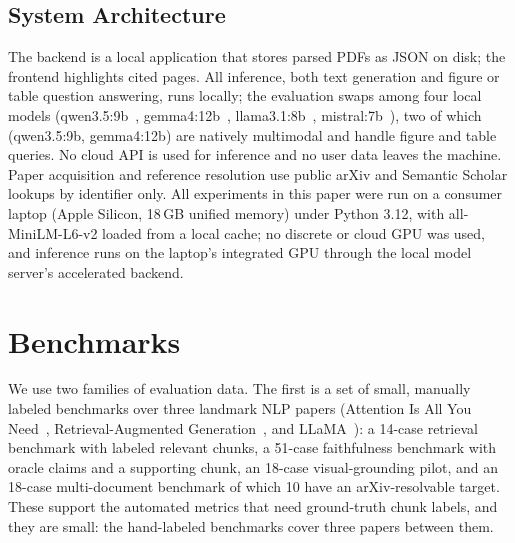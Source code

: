 \documentclass[letterpaper]{article} %
\begin{document}
\subsection{System Architecture}
The backend is a local application that stores parsed PDFs as JSON on disk; the
frontend highlights cited pages. All inference, both text generation and figure or
table question answering, runs locally; the evaluation swaps among four local models
(qwen3.5:9b~\citep{qwenteam2026qwen35}, gemma4:12b~\citep{gemmateam2024gemma},
llama3.1:8b~\citep{llamateam2024llama3}, mistral:7b~\citep{jiang2023mistral}),
two of which (qwen3.5:9b, gemma4:12b) are natively multimodal and handle figure and
table queries. No cloud API is used for inference and no user data leaves the machine. Paper
acquisition and reference resolution use public arXiv and Semantic Scholar lookups
by identifier only. All
experiments in this paper were run on a consumer laptop (Apple Silicon, 18\,GB
unified memory) under Python 3.12, with all-MiniLM-L6-v2 loaded from a local cache;
no discrete or cloud GPU was used, and inference runs on the laptop's integrated GPU
through the local model server's accelerated backend.

\section{Benchmarks}
\label{sec:datasets}
We use two families of evaluation data. The first is a set of small, manually
labeled benchmarks over three landmark NLP papers (Attention Is All You
Need~\citep{vaswani2017attention}, Retrieval-Augmented
Generation~\citep{lewis2020rag}, and LLaMA~\citep{touvron2023llama}): a 14-case
retrieval benchmark with labeled relevant chunks, a 51-case faithfulness benchmark
with oracle claims and a supporting chunk, an 18-case visual-grounding pilot, and an
18-case multi-document benchmark of which 10 have an arXiv-resolvable target. These
support the automated metrics that need ground-truth chunk labels, and they are
small: the hand-labeled benchmarks cover three papers between them.
\end{document}
